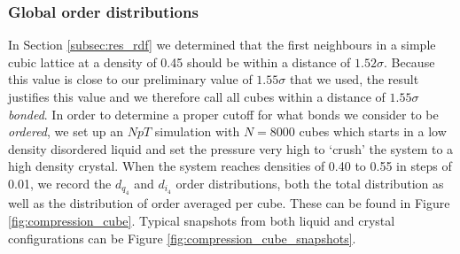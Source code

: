 \documentclass[thesis]{subfiles}
\begin{document}
\subsubsection{Global order distributions}\label{subsec:res_order cutoff}

In Section \ref{subsec:res_rdf} we determined that the first neighbours in a simple cubic lattice at a density of 0.45 should be within a distance of $1.52\sigma$. Because this value is close to our preliminary value of $1.55\sigma$ that we used, the result justifies this value and we therefore call all cubes within a distance of $1.55\sigma$ \emph{bonded}.
In order to determine a proper cutoff for what bonds we consider to be \emph{ordered}, we set up an $NpT$ simulation with $N = 8000$ cubes which starts in a low density disordered liquid and set the pressure very high to `crush' the system to a high density crystal. When the system reaches densities of 0.40 to 0.55 in steps of 0.01, we record the $d_{q_4}$ and $d_{i_4}$ order distributions, both the total distribution as well as the distribution of order averaged per cube. These can be found in Figure \ref{fig:compression_cube}. Typical snapshots from both liquid and crystal configurations can be Figure \ref{fig:compression_cube_snapshots}.
\end{document}

